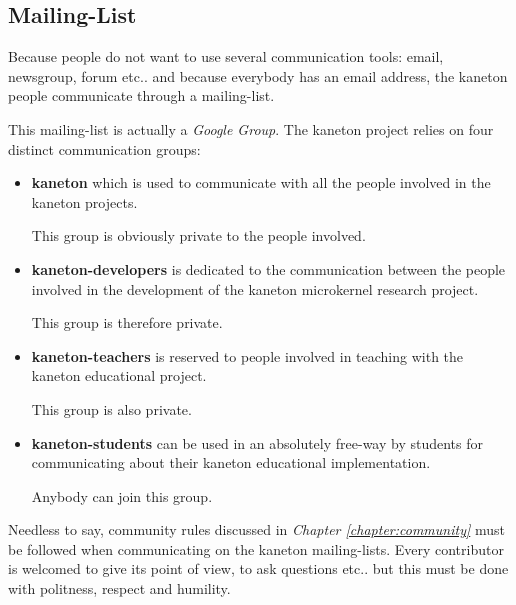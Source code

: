 %
%
%
%
%
%

%
%

\subsection{Mailing-List}
\label{section:mailing-list}

Because people do not want to use several communication tools: email,
newsgroup, forum etc.. and because everybody has an email address, the
kaneton people communicate through a mailing-list.

This mailing-list is actually a \textit{Google Group}. The kaneton
project relies on four distinct communication groups:

\begin{itemize}
  \item
    \textbf{kaneton} which is used to communicate with all the people involved
    in the kaneton projects.

    \-

    This group is obviously private to the people involved.
  \item
    \textbf{kaneton-developers} is dedicated to the communication between the
    people involved in the development of the kaneton microkernel research
    project.

    \-

    This group is therefore private.
  \item
    \textbf{kaneton-teachers} is reserved to people involved in teaching
    with the kaneton educational project.

    \-

    This group is also private.
  \item
    \textbf{kaneton-students} can be used in an absolutely free-way by
    students for communicating about their kaneton educational implementation.

    \-

    Anybody can join this group.
\end{itemize}

Needless to say, community rules discussed in \textit{Chapter
\ref{chapter:community}} must be followed when communicating on the kaneton
mailing-lists. Every contributor is welcomed to give its point of view, to
ask questions etc.. but this must be done with politness, respect and humility.

